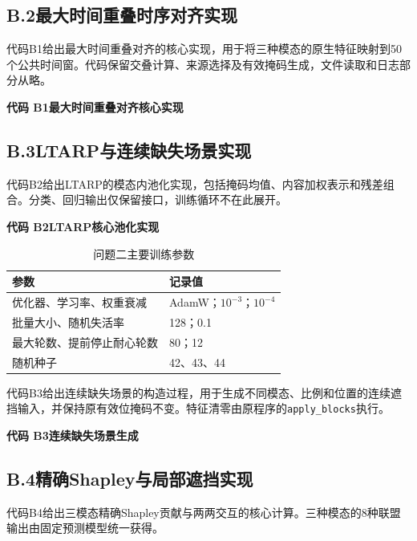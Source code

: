 \subsection*{B.2\quad 最大时间重叠时序对齐实现}
代码B1给出最大时间重叠对齐的核心实现，用于将三种模态的原生特征映射到50个公共时间窗。代码保留交叠计算、来源选择及有效掩码生成，文件读取和日志部分从略。

\noindent\textbf{代码 B1\quad 最大时间重叠对齐核心实现}


\subsection*{B.3\quad LTARP与连续缺失场景实现}
代码B2给出LTARP的模态内池化实现，包括掩码均值、内容加权表示和残差组合。分类、回归输出仅保留接口，训练循环不在此展开。

\noindent\textbf{代码 B2\quad LTARP核心池化实现}


\begin{table}[H]
\centering\normalsize
\caption{问题二主要训练参数}\label{tab:app_b_train}
\begin{tabular}{@{}ll@{}}
\toprule 参数 & 记录值\\\midrule
优化器、学习率、权重衰减 & AdamW；$10^{-3}$；$10^{-4}$\\
批量大小、随机失活率 & 128；0.1\\
最大轮数、提前停止耐心轮数 & 80；12\\
随机种子 & 42、43、44\\
\bottomrule\end{tabular}\end{table}

代码B3给出连续缺失场景的构造过程，用于生成不同模态、比例和位置的连续遮挡输入，并保持原有效位掩码不变。特征清零由原程序的\texttt{apply\_blocks}执行。

\noindent\textbf{代码 B3\quad 连续缺失场景生成}


\subsection*{B.4\quad 精确Shapley与局部遮挡实现}
代码B4给出三模态精确Shapley贡献与两两交互的核心计算。三种模态的8种联盟输出由固定预测模型统一获得。

